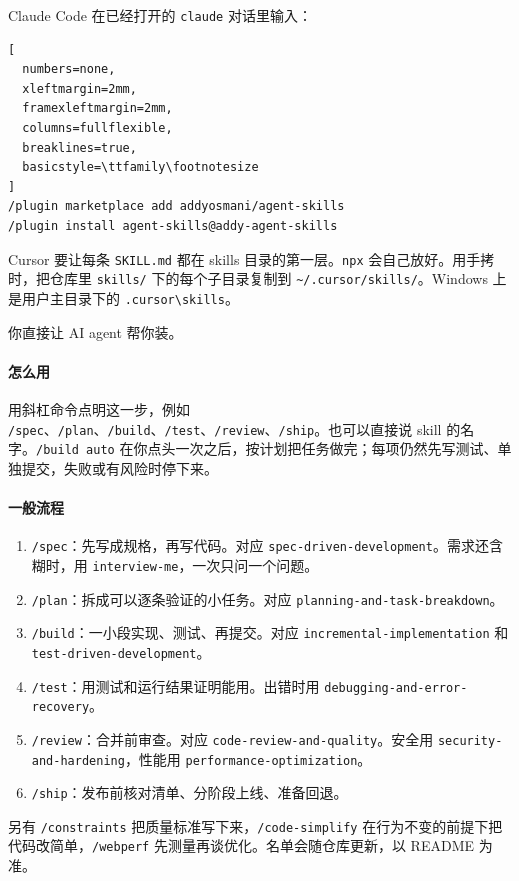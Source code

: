 Claude Code 在已经打开的 \verb|claude| 对话里输入：
\begin{lstlisting}[
  numbers=none,
  xleftmargin=2mm,
  framexleftmargin=2mm,
  columns=fullflexible,
  breaklines=true,
  basicstyle=\ttfamily\footnotesize
]
/plugin marketplace add addyosmani/agent-skills
/plugin install agent-skills@addy-agent-skills
\end{lstlisting}

Cursor 要让每条 \verb|SKILL.md| 都在 skills 目录的第一层。\verb|npx| 会自己放好。用手拷时，把仓库里 \verb|skills/| 下的每个子目录复制到 \verb|~/.cursor/skills/|。Windows 上是用户主目录下的 \verb|.cursor\skills|。

\begin{xiaonao}
你直接让 AI agent 帮你装。
\end{xiaonao}

\paragraph{怎么用}
用斜杠命令点明这一步，例如 \verb|/spec|、\verb|/plan|、\verb|/build|、\verb|/test|、\verb|/review|、\verb|/ship|。也可以直接说 skill 的名字。\verb|/build auto| 在你点头一次之后，按计划把任务做完；每项仍然先写测试、单独提交，失败或有风险时停下来。

\paragraph{一般流程}
\begin{enumerate}
\item \verb|/spec|：先写成规格，再写代码。对应 \verb|spec-driven-development|。需求还含糊时，用 \verb|interview-me|，一次只问一个问题。
\item \verb|/plan|：拆成可以逐条验证的小任务。对应 \verb|planning-and-task-breakdown|。
\item \verb|/build|：一小段实现、测试、再提交。对应 \verb|incremental-implementation| 和 \verb|test-driven-development|。
\item \verb|/test|：用测试和运行结果证明能用。出错时用 \verb|debugging-and-error-recovery|。
\item \verb|/review|：合并前审查。对应 \verb|code-review-and-quality|。安全用 \verb|security-and-hardening|，性能用 \verb|performance-optimization|。
\item \verb|/ship|：发布前核对清单、分阶段上线、准备回退。
\end{enumerate}
另有 \verb|/constraints| 把质量标准写下来，\verb|/code-simplify| 在行为不变的前提下把代码改简单，\verb|/webperf| 先测量再谈优化。名单会随仓库更新，以 README 为准。

